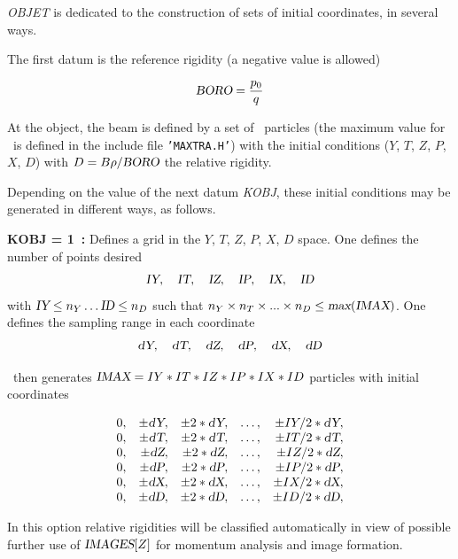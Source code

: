 \textsl{OBJET} is dedicated to the construction of sets of  initial coordinates, in several ways.  
\medskip

\noindent The first datum is the reference rigidity (a negative value is allowed)  
 
$$ \textsl{BORO} = \dfrac{p_0 }{ q}  $$

\noindent At the object, the beam is defined by a set of \IMAX\ particles 
(the maximum value for \IMAX\ is defined in the include file \texttt{'MAXTRA.H'}) with 
the initial conditions ($ Y$, $T$, $Z$, $P$, $X$, $D$)  with $ D =B\rho/\textsl{BORO}$ 
 the relative rigidity. 

\noindent Depending on the value of the next datum \textsl{KOBJ}, these initial
conditions may be generated   in  different ways, as follows. 
\bigskip

\noindent\textbf{KOBJ  =  1~:}   Defines a grid in the $ Y$, $T$, $Z$, $P$, $X$, $D$
 space. One defines the number of points desired 
$$ \textsl{IY},\quad \textsl{IT},\quad \textsl{IZ},\quad \textsl{IP}, \quad \textsl{IX}, \quad \textsl{ID}\\$$
with  $ \textsl{IY}\leq n_Y \ldots \textsl{ID}\leq n_D$ such that $ n_Y \times n_T \times ... \times n_D \leq \textsl{max}(\textsl{IMAX})$. 
 One defines the sampling range in each coordinate
$$	 \textsl{dY},\quad \textsl{dT},\quad \textsl{dZ},\quad \textsl{dP},\quad \textsl{dX}, \quad \textsl{dD}  $$


\noindent\zgou\  then generates 
$ \textsl{IMAX} = IY  \ast  IT  \ast  IZ \ast   IP \ast IX \ast  ID $ particles with  initial coordinates 

$$
  \begin{array}{*{5}{r<{,}}}
	  0  &  \pm \dY &   \pm 2  \ast   \dY & \ldots & \pm IY/2  \ast   \dY \\
	  0  &  \pm \dT &   \pm 2 \ast   \dT  & \ldots &  \pm IT/2  \ast   \dT \\
	  0  &  \pm \dZ &   \pm 2 \ast  \dZ   & \ldots &  \pm IZ/2 \ast \dZ \\
	  0  &  \pm \dP &   \pm 2  \ast \dP  & \ldots  &  \pm IP/2  \ast  \dP \\
	  0  &  \pm \dX &   \pm 2  \ast  \dX & \ldots  &  \pm IX/2 \ast   \dX \\
 	  0  &  \pm \dD &   \pm 2  \ast  \dD & \ldots  &  \pm ID/2 \ast   \dD 
 \end{array}
 $$

\medskip

\noindent In this option relative rigidities  will be classified automatically in view of possible 
further  use of $\textsl{IMAGES}[Z]$ for momentum analysis and image formation. 


